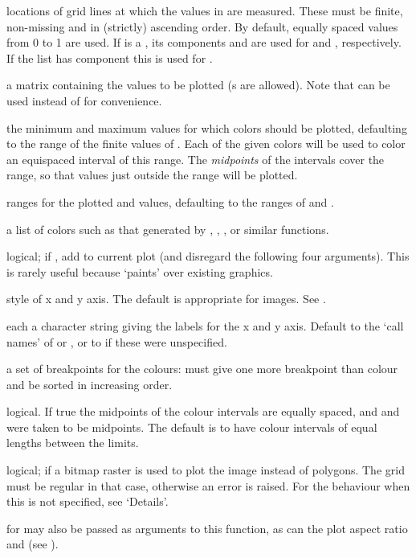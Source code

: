 \begin{Arguments}
\begin{ldescription}
\item[\code{x,y}] locations of grid lines at which the values in  are
measured.  These must be finite, non-missing and in (strictly)
ascending order.  By default, equally
spaced values from 0 to 1 are used.  If  is a ,
its components  and  are used for 
and , respectively. If the list has component  this
is used for .
\item[\code{z}] a matrix containing the values to be plotted (s are
allowed).  Note that  can be used instead of  for
convenience.
\item[\code{zlim}] the minimum and maximum  values for which colors
should be plotted, defaulting to the range of the finite values of
. Each of the given colors will be used to color an
equispaced interval of this range. The \emph{midpoints} of the
intervals cover the range, so that values just outside the range
will be plotted.
\item[\code{xlim, ylim}] ranges for the plotted  and  values,
defaulting to the ranges of  and .
\item[\code{col}] a list of colors such as that generated by
, ,
,  or similar
functions.
\item[\code{add}] logical; if , add to current plot (and disregard
the following four arguments).  This is rarely useful because
 `paints' over existing graphics.
\item[\code{xaxs, yaxs}] style of x and y axis.  The default  is
appropriate for images.  See .
\item[\code{xlab, ylab}] each a character string giving the labels for the x and
y axis.  Default to the `call names' of  or , or to
 if these were unspecified.
\item[\code{breaks}] a set of breakpoints for the colours: must give one more
breakpoint than colour and be sorted in increasing order.
\item[\code{oldstyle}] logical. If true the midpoints of the colour intervals
are equally spaced, and  and  were taken
to be midpoints.  The default is to have colour intervals of equal
lengths between the limits.
\item[\code{useRaster}] logical; if  a bitmap raster is used to
plot the image instead of polygons. The grid must be regular in that
case, otherwise an error is raised.   For the behaviour when this is
not specified, see `Details'.
\item[\code{...}]  for  may also be
passed as arguments to this function, as can the plot aspect ratio
 and  (see ).
\end{ldescription}
\end{Arguments}

